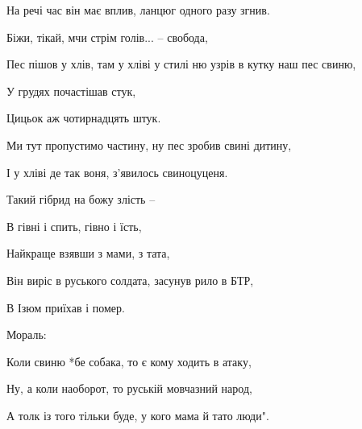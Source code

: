 На речі час він має вплив, ланцюг одного разу згнив.

Біжи, тікай, мчи стрім голів... – свобода,

Пес пішов у хлів, там у хліві у стилі ню узрів в кутку наш пес свиню,

У грудях почастішав стук,

Цицьок аж чотирнадцять штук.

Ми тут пропустимо частину, ну пес зробив свині дитину,

І у хліві де так воня, з'явилось свиноцуценя.

Такий гібрид на божу злість –

В гівні і спить, гівно і їсть,

Найкраще взявши з мами, з тата,

Він виріс в руського солдата, засунув рило в БТР,

В Ізюм приїхав і помер.

Мораль:

Коли свиню *бе собака, то є кому ходить в атаку,

Ну, а коли наоборот, то руській мовчазний народ,

А толк із того тільки буде, у кого мама й тато люди".
